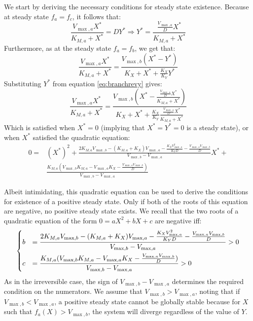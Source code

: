    We start by deriving the necessary conditions for steady state existence.
   Because at steady state $f_a=f_c$, it follows that:
    \begin{equation}
        \label{eq:branchrevy}
        \frac{V_{\max,a}X^*}{K_{M,a}+X^*}=DY^* \Rightarrow Y^*=\frac{\frac{V_{\max,a}}{D}X^*}{K_{M,a}+X^*}
    \end{equation}
    Furthermore, as at the steady state $f_a=f_b$, we get that:
    \begin{equation*}
        \frac{V_{\max,a}X^*}{K_{M,a}+X^*}=\frac{V_{\max,b}(X^*-Y^*)}{K_X+X^*+\frac{K_X}{K_Y}Y^*}
    \end{equation*}
    Substituting $Y^*$ from equation \ref{eq:branchrevy} gives:
    \begin{equation*}
        \frac{V_{\max,a}X^*}{K_{M,a}+X^*}=\frac{V_{\max,b}(X^*-\frac{\frac{V_{\max,a}}{D}X^*}{K_{M,a}+X^*})}{K_X+X^*+\frac{K_X}{K_Y}\frac{\frac{V_{\max,a}}{D}X^*}{K_{M,a}+X^*}}
    \end{equation*}
    Which is satisfied when $X^*=0$ (implying that $X^*=Y^*=0$ is a steady state), or when $X^*$ satisfied the quadratic equation:
    \begin{align*}
        0=&(X^*)^2+\frac{2K_{M,a}V_{\max,b}-(K_{M,a}+K_X)V_{\max,a}-\frac{K_XV_{\max,a}^2}{K_YD}-\frac{V_{\max,a}V_{\max,b}}{D}}{V_{\max,b}-V_{\max,a}}X^*+\\
        &\frac{K_{M,a}(V_{\max,b}K_{M,a}-V_{\max,a}K_X-\frac{V_{\max,a}V_{\max,b}}{D})}{V_{\max,b}-V_{\max,a}}
    \end{align*}

Albeit intimidating, this quadratic equation can be used to derive the conditions for existence of a positive steady state.
Only if both of the roots of this equation are negative, no positive steady state exists.
We recall that the two roots of a quadratic equation of the form $0=aX^2+bX+c$ are negative iff:
\begin{align*}
    \begin{dcases}
        b&=\frac{2K_{M,a}V_{\max,b}-(K_{M,a}+K_X)V_{\max,a}-\frac{K_XV_{\max,a}^2}{K_YD}-\frac{V_{\max,a}V_{\max,b}}{D}}{V_{\max,b}-V_{\max,a}}>0 \\
        c&=\frac{K_{M,a}(V_{\max,b}K_{M,a}-V_{\max,a}K_X-\frac{V_{\max,a}V_{\max,b}}{D})}{V_{\max,b}-V_{\max,a}}>0
    \end{dcases}
\end{align*}
As in the irreversible case, the sign of $V_{\max,b}-V_{\max,a}$ determines the required condition on the numerators.
We assume that $V_{\max,b}>V_{\max,a}$, noting that if $V_{\max,b}<V_{\max,a}$, a positive steady state cannot be globally stable because for $X$ such that $f_a(X)>V_{\max,b}$, the system will diverge regardless of the value of $Y$.

